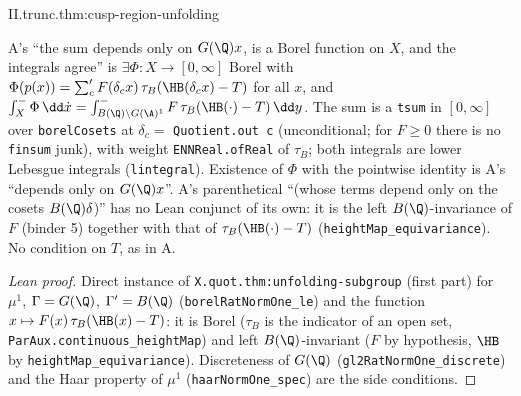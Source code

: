 \begin{tfformal}{II.trunc.thm:cusp-region-unfolding}
\begin{tffidelity}
A's ``the sum depends only on $G(\Q)x$, is a Borel function on $X$, and the integrals agree'' is $\exists\Phi\colon X\to[0,\infty]$ Borel with $\Phi(p(x))=\sum'_{c}F(\delta_cx)\,\tau_B(\HB(\delta_cx)-T)$ for all $x$, and $\int^-_X\Phi\,\dd\dot x=\int^-_{B(\Q)\backslash G(\A)^1}F\,\tau_B(\HB(\cdot)-T)\,\dd y$. The sum is a \texttt{tsum} in $[0,\infty]$ over \texttt{borelCosets} at $\delta_c=$ \texttt{Quotient.out c} (unconditional; for $F\ge0$ there is no \texttt{finsum} junk), with weight \texttt{ENNReal.ofReal} of $\tau_B$; both integrals are lower Lebesgue integrals (\texttt{lintegral}). Existence of $\Phi$ with the pointwise identity is A's ``depends only on $G(\Q)x$''. A's parenthetical ``(whose terms depend only on the cosets $B(\Q)\delta$)'' has no Lean conjunct of its own: it is the left $B(\Q)$-invariance of $F$ (binder 5) together with that of $\tau_B(\HB(\cdot)-T)$ (\texttt{heightMap\_equivariance}). No condition on $T$, as in A.
\end{tffidelity}
\end{tfformal}
\begin{proof}[Lean proof]
Direct instance of \texttt{X.quot.thm:unfolding-subgroup} (first part) for $\mu^1$, $\Gamma=G(\Q)$, $\Gamma'=B(\Q)$ (\texttt{borelRatNormOne\_le}) and the function $x\mapsto F(x)\,\tau_B(\HB(x)-T)$: it is Borel ($\tau_B$ is the indicator of an open set, \texttt{ParAux.continuous\_heightMap}) and left $B(\Q)$-invariant ($F$ by hypothesis, $\HB$ by \texttt{heightMap\_equivariance}). Discreteness of $G(\Q)$ (\texttt{gl2RatNormOne\_discrete}) and the Haar property of $\mu^1$ (\texttt{haarNormOne\_spec}) are the side conditions.
\end{proof}

